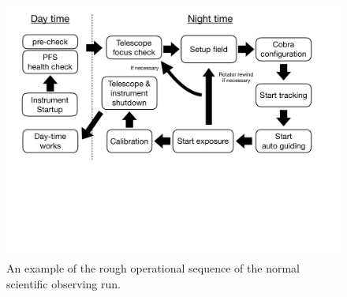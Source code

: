\documentclass[a4paper]{article}
\begin{document}
\begin{figure}[!htb]
\begin{center}
\includegraphics[scale=0.4]{./figures/PFS_night_operation_sequence_overall_cut.pdf}
\end{center}
\caption{An example of the rough operational sequence of the normal scientific observing run. \label{fig:operation_sequence_overall1}}
\end{figure}
\end{document}
